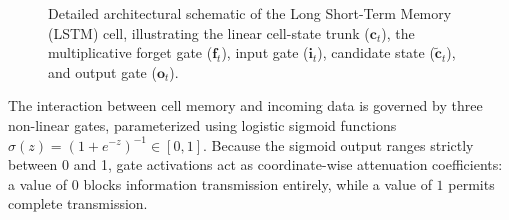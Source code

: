 \documentclass[../../main.tex]{subfiles}
\begin{document}
\begin{figure}[htbp]
\caption{Detailed architectural schematic of the Long Short-Term Memory (LSTM) cell, illustrating the linear cell-state trunk ($\mathbf{c}_t$), the multiplicative forget gate ($\mathbf{f}_t$), input gate ($\mathbf{i}_t$), candidate state ($\tilde{\mathbf{c}}_t$), and output gate ($\mathbf{o}_t$).}
\label{fig:rnn_lstm_cell}
\end{figure}

The interaction between cell memory and incoming data is governed by three non-linear gates, parameterized using logistic sigmoid functions $\sigma(z) = (1 + e^{-z})^{-1} \in [0, 1]$. Because the sigmoid output ranges strictly between 0 and 1, gate activations act as coordinate-wise attenuation coefficients: a value of $0$ blocks information transmission entirely, while a value of $1$ permits complete transmission.
\end{document}
